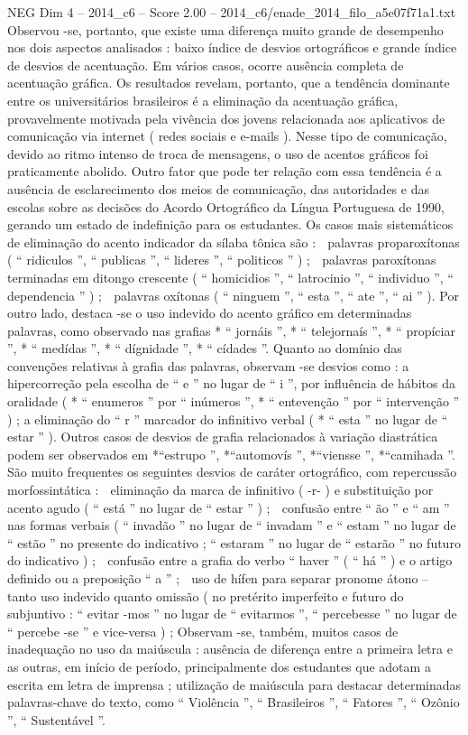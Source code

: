 \begin{textsample}{NEG Dim 4 – 2014\_c6 – Score 2.00 – 2014\_c6/enade\_2014\_filo\_a5e07f71a1.txt}
Observou -se, portanto, que existe uma diferença muito grande de desempenho nos dois aspectos analisados : baixo índice de desvios ortográficos e grande índice de desvios de acentuação.
Em vários casos, ocorre ausência completa de acentuação gráfica.
Os resultados revelam, portanto, que a tendência dominante entre os universitários brasileiros é a eliminação da acentuação gráfica, provavelmente motivada pela vivência dos jovens relacionada aos aplicativos de comunicação via internet ( redes sociais e e-mails ).
Nesse tipo de comunicação, devido ao ritmo intenso de troca de mensagens, o uso de acentos gráficos foi praticamente abolido.
Outro fator que pode ter relação com essa tendência é a ausência de esclarecimento dos meios de comunicação, das autoridades e das escolas sobre as decisões do Acordo Ortográfico da Língua Portuguesa de 1990, gerando um estado de indefinição para os estudantes.
Os casos mais sistemáticos de eliminação do acento indicador da sílaba tônica são :  palavras proparoxítonas ( “ ridiculos ”, “ publicas ”, “ lideres ”, “ politicos ” ) ;  palavras paroxítonas terminadas em ditongo crescente ( “ homicidios ”, “ latrocinio ”, “ individuo ”, “ dependencia ” ) ;  palavras oxítonas ( “ ninguem ”, “ esta ”, “ ate ”, “ ai ” ).
Por outro lado, destaca -se o uso indevido do acento gráfico em determinadas palavras, como observado nas grafias * “ jornáis ”, * “ telejornaís ”, * “ propíciar ”, * “ medídas ”, * “ dígnidade ”, * “ cídades ”.
Quanto ao domínio das convenções relativas à grafia das palavras, observam -se desvios como : a hipercorreção pela escolha de “ e ” no lugar de “ i ”, por influência de hábitos da oralidade ( * “ enumeros ” por “ inúmeros ”, * “ entevenção ” por “ intervenção ” ) ; a eliminação do “ r ” marcador do infinitivo verbal ( * “ esta ” no lugar de “ estar ” ).
Outros casos de desvios de grafia relacionados à variação diastrática podem ser observados em *“estrupo ”, *“automovís ”, *“viensse ”, *“camihada ”.
São muito frequentes os seguintes desvios de caráter ortográfico, com repercussão morfossintática :  eliminação da marca de infinitivo ( -r- ) e substituição por acento agudo ( “ está ” no lugar de “ estar ” ) ;  confusão entre “ ão ” e “ am ” nas formas verbais ( “ invadão ” no lugar de “ invadam ” e “ estam ” no lugar de “ estão ” no presente do indicativo ; “ estaram ” no lugar de “ estarão ” no futuro do indicativo ) ;  confusão entre a grafia do verbo “ haver ” ( “ há ” ) e o artigo definido ou a preposição “ a ” ;  uso de hífen para separar pronome átono – tanto uso indevido quanto omissão ( no pretérito imperfeito e futuro do subjuntivo : “ evitar -mos ” no lugar de “ evitarmos ”, “ percebesse ” no lugar de “ percebe -se ” e vice-versa ) ; Observam -se, também, muitos casos de inadequação no uso da maiúscula : ausência de diferença entre a primeira letra e as outras, em início de período, principalmente dos estudantes que adotam a escrita em letra de imprensa ; utilização de maiúscula para destacar determinadas palavras-chave do texto, como “ Violência ”, “ Brasileiros ”, “ Fatores ”, “ Ozônio ”, “ Sustentável ”.

\end{textsample}
